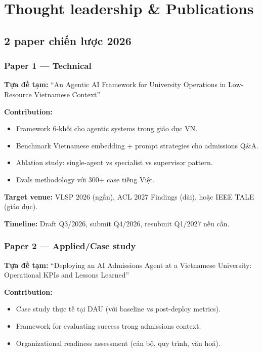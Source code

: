 \documentclass[11pt,a4paper]{article}
\begin{document}
\section{Thought leadership \& Publications}

\subsection{2 paper chiến lược 2026}

\subsubsection*{Paper 1 — Technical}

\textbf{Tựa đề tạm:} ``An Agentic AI Framework for University Operations in
Low-Resource Vietnamese Context''

\textbf{Contribution:}
\begin{itemize}
\item Framework 6-khối cho agentic systems trong giáo dục VN.
\item Benchmark Vietnamese embedding + prompt strategies cho admissions Q\&A.
\item Ablation study: single-agent vs specialist vs supervisor pattern.
\item Evals methodology với 300+ case tiếng Việt.
\end{itemize}

\textbf{Target venue:} VLSP 2026 (ngắn), ACL 2027 Findings (dài), hoặc IEEE TALE
(giáo dục).

\textbf{Timeline:} Draft Q3/2026, submit Q4/2026, resubmit Q1/2027 nếu cần.

\subsubsection*{Paper 2 — Applied/Case study}

\textbf{Tựa đề tạm:} ``Deploying an AI Admissions Agent at a Vietnamese
University: Operational KPIs and Lessons Learned''

\textbf{Contribution:}
\begin{itemize}
\item Case study thực tế tại DAU (với baseline vs post-deploy metrics).
\item Framework for evaluating success trong admissions context.
\item Organizational readiness assessment (cán bộ, quy trình, văn hoá).
\end{itemize}
\end{document}
